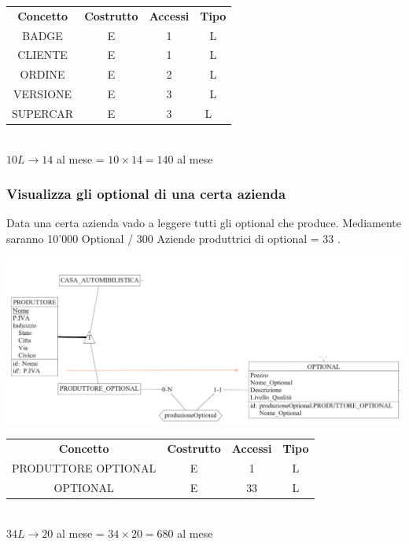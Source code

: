 \documentclass[12pt]{article}
\begin{document}
\begin{table}[H]
    \centering
    \begin{tabular}{ c c c c }
        \rowcolor{red!20!}
        \textbf{Concetto} & \textbf{Costrutto}  & \textbf{Accessi} &
        \textbf{Tipo}\\ 
        BADGE & E & 1 & L \\ 
        CLIENTE & E & 1 & L \\ 
        ORDINE & E & 2 & L \\ 
        VERSIONE & E & 3 & L \\ 
        SUPERCAR & E & 3 & L \ \end{tabular}\\
        \( 10L  \rightarrow 14 \) al mese = \( 10 \times 14 = 140 \) al mese
\end{table}

\subsubsection{Visualizza gli optional di una certa azienda} \label{Visualizza
gli optional di una certa azienda}

Data una certa azienda vado a leggere tutti gli optional che produce. Mediamente
saranno 10'000 Optional / 300 Aziende produttrici di optional = 33 .

\begin{center}
    \includegraphics[scale=0.50]{images/optionalProduttore.png}
\end{center}

\begin{table}[H]
    \centering
    \begin{tabular}{ c c c c } 
        \rowcolor{red!20!}
        \textbf{Concetto} & \textbf{Costrutto} & \textbf{Accessi} &
        \textbf{Tipo}\\ 
        PRODUTTORE OPTIONAL & E & 1 & L \\ 
        OPTIONAL & E & 33 & L \\ 
    \end{tabular}\\
    \( 34L \rightarrow 20\) al mese = \( 34 \times 20 = 680 \) al mese
\end{table}
\end{document}
